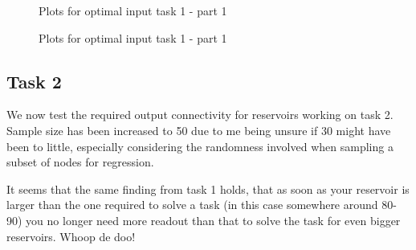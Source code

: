 \begin{figure*}[ht]
    \centering
    \resizebox{\textwidth}{!}{
        \subfloat[N=10]{
            
        }
        \subfloat[N=20]{
            
        }
    }
    \resizebox{\textwidth}{!}{
        \subfloat[N=30]{
            
        }
        \subfloat[N=40]{
            
        }
    }
    \resizebox{\textwidth}{!}{
        \subfloat[N=50]{
            
        }
        \subfloat[N=60]{
            
        }
    }
    \caption{Plots for optimal input task 1 - part 1}
\end{figure*}

\begin{figure*}[ht]
    \resizebox{\textwidth}{!}{
        \subfloat[N=80]{
            
        }
        \subfloat[N=90]{
            
        }
    }
    \resizebox{0.5\textwidth}{!}{
        \subfloat[N=100]{
            
        }
    }
    \caption{Plots for optimal input task 1 - part 1}
\end{figure*}

\subsection{Task 2}

We now test the required output connectivity for reservoirs working on task 2.
Sample size has been increased to 50 due to me being unsure if 30 might have been to little,
especially considering the randomness involved when sampling a subset of nodes for regression.

It seems that the same finding from task 1 holds, that as soon as your reservoir is larger than the one required to solve a task (in this case somewhere around 80-90) you no longer need more readout than that to solve the task for even bigger reservoirs.
Whoop de doo!

